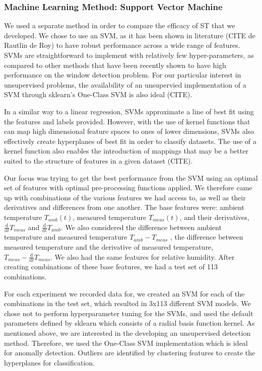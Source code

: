 \documentclass[sigconf]{acmart}
\begin{document}
\hypertarget{machine-learning-method-support-vector-machine}{%
\subsubsection{Machine Learning Method: Support Vector
Machine}\label{machine-learning-method-support-vector-machine}}

We used a separate method in order to compare the efficacy of ST that we
developed. We chose to use an SVM, as it has been shown in literature
(CITE de Rautlin de Roy) to have robust performance across a wide range
of features. SVMs are straightforward to implement with relatively few
hyper-parameters, as compared to other methods that have been recently
shown to have high performance on the window detection problem. For our
particular interest in unsupervised problems, the availability of an
unsupervied implementation of a SVM through sklearn's One-Class SVM is
also ideal (CITE).

In a similar way to a linear regression, SVMs approximate a line of best
fit using the features and labels provided. However, with the use of
kernel functions that can map high dimensional feature spaces to ones of
lower dimensions, SVMs also effectively create hyperplanes of best fit
in order to classify datasets. The use of a kernel function also enables
the introduction of mappings that may be a better suited to the
structure of features in a given dataset (CITE).

Our focus was trying to get the best performance from the SVM using an
optimal set of features with optimal pre-processing functions applied.
We therefore came up with combinations of the various features we had
access to, as well as their derivatives and differences from one
another. The base features were: ambient temperature \(T_{amb}(t)\),
measured temperature \(T_{meas}(t)\), and their derivatives,
\(\frac{\mathrm{d}}{\mathrm{d}t}T_{meas}\) and
\(\frac{\mathrm{d}}{\mathrm{d}t}T_{amb}\). We also considered the
difference between ambient temperature and measured temperature
\(T_{amb} - T_{meas}\) , the difference between measured temperature and
the derivative of measured temperature,
\(T_{meas} - \frac{\mathrm{d}}{\mathrm{d}t}T_{meas}\). We also had the
same features for relative humidity. After creating combinations of
these base features, we had a test set of 113 combinations.

For each experiment we recorded data for, we created an SVM for each of
the combinations in the test set, which resulted in 3x113 different SVM
models. We chose not to perform hyperparameter tuning for the SVMs, and
used the default parameters defined by sklearn which consists of a
radial basis function kernel. As mentioned above, we are interested in
the developing an unsupervised detection method. Therefore, we used the
One-Class SVM implementation which is ideal for anomally detection.
Outliers are identified by clustering features to create the hyperplanes
for classification.
\end{document}
